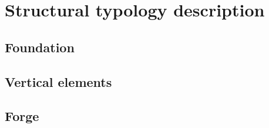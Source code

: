 \chapter{Structural typology description}
	\section{Foundation}
	
	\section{Vertical elements}
	
	\section{Forge}